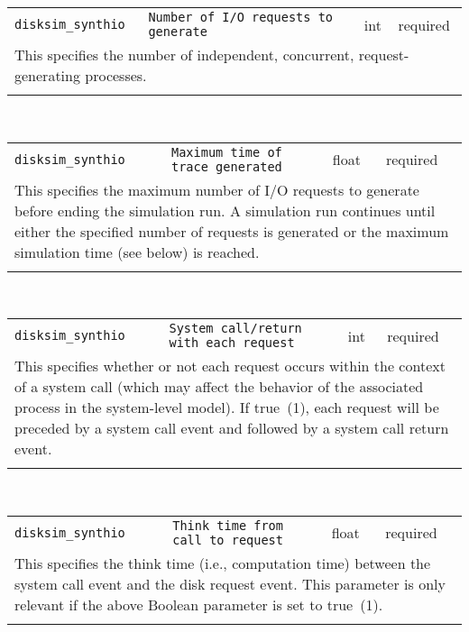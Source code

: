 \noindent 
\begin{tabular}{|p{1.5in}|p{3.5in}|p{0.5in}|p{0.5in}|}
\cline{1-4}
\texttt{disksim\_synthio} & \texttt{Number of I/O requests to generate} & int & required \\ 
\cline{1-4}
\multicolumn{4}{|p{6in}|}{
This specifies the number of independent, concurrent, request-generating
processes.
}\\ 
\cline{1-4}
\multicolumn{4}{p{5in}}{}\\
\end{tabular}\\ 
\noindent 
\begin{tabular}{|p{1.5in}|p{3.5in}|p{0.5in}|p{0.5in}|}
\cline{1-4}
\texttt{disksim\_synthio} & \texttt{Maximum time of trace generated} & float & required \\ 
\cline{1-4}
\multicolumn{4}{|p{6in}|}{
This specifies the maximum number of I/O requests to generate before
ending the simulation run. A simulation run continues until either
the specified number of requests is generated or the maximum
simulation time (see below) is reached.
}\\ 
\cline{1-4}
\multicolumn{4}{p{5in}}{}\\
\end{tabular}\\ 
\noindent 
\begin{tabular}{|p{1.5in}|p{3.5in}|p{0.5in}|p{0.5in}|}
\cline{1-4}
\texttt{disksim\_synthio} & \texttt{System call/return with each request} & int & required \\ 
\cline{1-4}
\multicolumn{4}{|p{6in}|}{
This specifies whether or not each request occurs within the context of a
system call (which may affect the behavior of the associated process
in the system-level model). If true~(1), each request will be
preceded by a system call event and followed by a system call return
event.
}\\ 
\cline{1-4}
\multicolumn{4}{p{5in}}{}\\
\end{tabular}\\ 
\noindent 
\begin{tabular}{|p{1.5in}|p{3.5in}|p{0.5in}|p{0.5in}|}
\cline{1-4}
\texttt{disksim\_synthio} & \texttt{Think time from call to request} & float & required \\ 
\cline{1-4}
\multicolumn{4}{|p{6in}|}{
This specifies the think time (i.e., computation time) between the system
call event and the disk request event. This parameter is only
relevant if the above Boolean parameter is set to true~(1).
}\\ 
\cline{1-4}
\multicolumn{4}{p{5in}}{}\\
\end{tabular}\\ 
